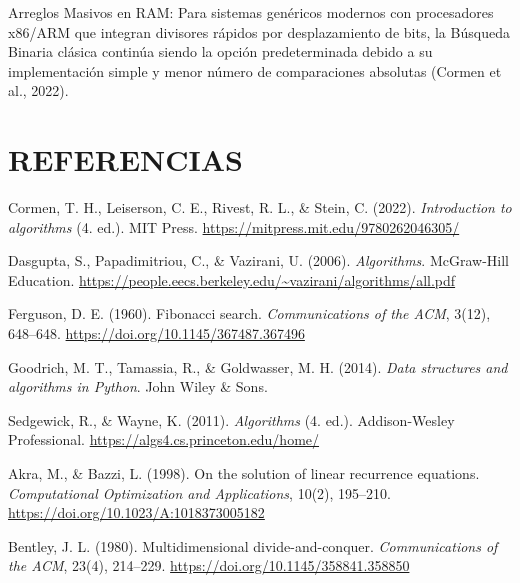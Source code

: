 \documentclass[12pt,a4paper]{article}
\begin{document}
Arreglos Masivos en RAM: Para sistemas genéricos modernos con procesadores x86/ARM que integran
divisores rápidos por desplazamiento de bits, la Búsqueda Binaria clásica continúa siendo la
opción predeterminada debido a su implementación simple y menor número de comparaciones absolutas
(Cormen et al., 2022).

\newpage
\section*{REFERENCIAS}

\setlength{\parindent}{0pt}
\begin{list}{}{%
  \setlength{\leftmargin}{1.27cm}
  \setlength{\itemindent}{-1.27cm}
  \setlength{\itemsep}{8pt}}

\item Cormen, T. H., Leiserson, C. E., Rivest, R. L., \& Stein, C. (2022).
\textit{Introduction to algorithms} (4.\textordfeminine{} ed.). MIT Press.
\url{https://mitpress.mit.edu/9780262046305/}

\item Dasgupta, S., Papadimitriou, C., \& Vazirani, U. (2006). \textit{Algorithms}.
McGraw-Hill Education. \url{https://people.eecs.berkeley.edu/~vazirani/algorithms/all.pdf}

\item Ferguson, D. E. (1960). Fibonacci search. \textit{Communications of the ACM},
3(12), 648--648. \url{https://doi.org/10.1145/367487.367496}

\item Goodrich, M. T., Tamassia, R., \& Goldwasser, M. H. (2014). \textit{Data structures
and algorithms in Python}. John Wiley \& Sons.

\item Sedgewick, R., \& Wayne, K. (2011). \textit{Algorithms} (4.\textordfeminine{} ed.).
Addison-Wesley Professional. \url{https://algs4.cs.princeton.edu/home/}

\item Akra, M., \& Bazzi, L. (1998). On the solution of linear recurrence equations.
\textit{Computational Optimization and Applications}, 10(2), 195--210.
\url{https://doi.org/10.1023/A:1018373005182}

\item Bentley, J. L. (1980). Multidimensional divide-and-conquer.
\textit{Communications of the ACM}, 23(4), 214--229.
\url{https://doi.org/10.1145/358841.358850}


\end{list}
\end{document}
